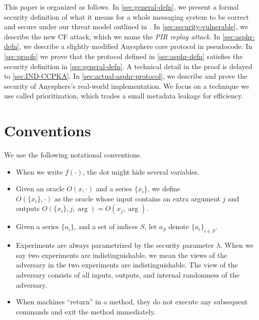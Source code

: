 This paper is organized as follows. In \cref{sec:general-defn}, we present a formal security definition of what it means for a whole messaging system to be correct and secure under our threat model outlined in \cite{whitepaper}. In \cref{sec:security-vulnerable}, we describe the new CF attack, which we name the \textit{PIR replay attack}. In \cref{sec:asphr-defn}, we describe a slightly modified Anysphere core protocol in pseudocode. In \cref{sec:proofs} we prove that the protocol defined in \cref{sec:asphr-defn} satisfies the security definition in \cref{sec:general-defn}. A technical detail in the proof is delayed to \cref{sec:IND-CCPKA}. In \cref{sec:actual-asphr-protocol}, we describe and prove the security of Anysphere's real-world implementation. We focus on a technique we use called prioritization, which trades a small metadata leakage for efficiency.



\section{Conventions}
We use the following notational conventions.
\begin{itemize}
    \item When we write $f(\cdot)$, the dot might hide several variables.
    
    \item Given an oracle $O(x, \cdot)$ and a series $\{x_i\}$, we define \\ $O(\{x_i\}, \cdot)$ as the oracle whose input contains an extra argument $j$ and outputs $O(\{x_i\}, j, \arg) = O(x_j, \arg)$.

    \item Given a series $\{a_i\}$, and a set of indices $S$, let $a_S$ denote $\{a_i\}_{i \in S}$. 

    \item Experiments are always parametrized by the security parameter $\lambda$. When we say two experiments are indistinguishable, we mean the views of the adversary in the two experiments are indistinguishable. The view of the adversary consists of all inputs, outputs, and internal randomness of the adversary.
    
    \item When machines ``return'' in a method, they do not execute any subsequent commands and exit the method immediately.
\end{itemize}
